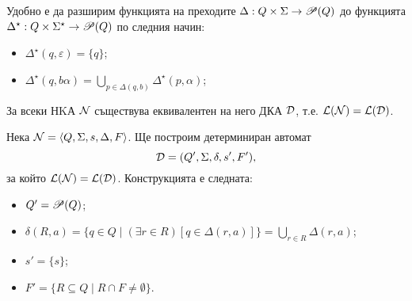 Удобно е да разширим функцията на преходите $\Delta: Q\times\Sigma \to \mathscr{P}(Q)$ 
до функцията $\Delta^\star: Q\times\Sigma^\star \to \mathscr{P}(Q)$ по следния начин:
\begin{itemize}
\item 
  $\Delta^\star(q, \varepsilon) = \{q\}$;
\item
  $\Delta^\star(q, b\alpha) = \bigcup_{p \in \Delta(q,b)} \Delta^\star(p, \alpha)$;
\end{itemize}

\begin{framed}
\begin{thm}
  За всеки НKА $\mathcal{N}$ съществува еквивалентен на него ДКА $\mathcal{D}$, т.е. $\mathcal{L}(\mathcal{N}) = \mathcal{L}(\mathcal{D})$.
\end{thm}
\end{framed}
\begin{hint}
  Нека $\mathcal{N} = \langle{Q,\Sigma,s,\Delta,F}\rangle$. Ще построим детерминиран автомат
  \[\mathcal{D} = (Q',\Sigma,\delta,s',F'),\]
  за който $\mathcal{L}(\mathcal{N}) = \mathcal{L}(\mathcal{D})$.
  Конструкцията е следната:
  \begin{itemize}
  \item
    $Q' = \mathscr{P}(Q)$;
  \item
    $\delta(R,a) = \{q\in Q\mid (\exists r\in R)[q\in\Delta(r,a)]\} = \bigcup_{r\in R}\Delta(r,a)$;
  \item
    $s' = \{s\}$;
  \item
    $F' = \{R \subseteq Q \mid R\cap F \neq \emptyset\}$.
  \end{itemize}
\end{hint}



